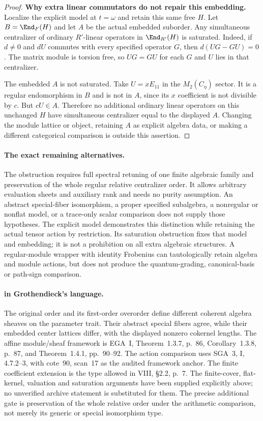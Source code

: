 \begin{proof}
\par\smallskip\noindent\textbf{Why extra linear commutators do not repair this embedding.}\quad
Localize the explicit model at $t=\omega$ and retain
this same free $H$. Let $B=\End_F(H)$ and let $A$
be the actual embedded suborder.
Any simultaneous centralizer of ordinary $R'$-linear
operators in $\End_{R'}(H)$ is saturated.
Indeed, if $d\ne0$ and $dU$ commutes with every
specified operator $G$, then
$d(UG-GU)=0$.
The matrix module is torsion free, so $UG=GU$ for
each $G$ and $U$ lies in that centralizer.

The embedded $A$ is not saturated.
Take $U=xE_{11}$ in the $M_2(C_\eta)$ sector.
It is a regular endomorphism in $B$ and is not in
$A$, since its $x$ coefficient is not divisible
by $c$. But $cU\in A$.
Therefore no additional ordinary linear operators
on this unchanged $H$ have simultaneous centralizer
equal to the displayed $A$.
Changing the module lattice or object, retaining
$A$ as explicit algebra data, or making a different
categorical comparison is outside this assertion.
\end{proof}

\paragraph{The exact remaining alternatives.}
The obstruction requires full spectral retuning of
one finite algebraic family and preservation of the
whole regular relative centralizer order.
It allows arbitrary evaluation sheets and auxiliary
rank and needs no purity assumption.
An abstract special-fiber isomorphism, a proper
specified subalgebra, a nonregular or nonflat model,
or a trace-only scalar comparison does not supply
those hypotheses.
The explicit model demonstrates this distinction
while retaining the actual tensor action by restriction.
Its saturation obstruction fixes that model and
embedding; it is not a prohibition on all extra
algebraic structures.
A regular-module wrapper with identity Frobenius
can tautologically retain algebra and module actions,
but does not produce the quantum-grading, canonical-basis
or path-sign comparison.

\paragraph{ in Grothendieck's language.}
The original order and its first-order overorder
define different coherent algebra sheaves on the
parameter trait. Their abstract special fibers agree,
while their embedded center lattices differ, with
the displayed nonzero cokernel lengths.
The affine module/sheaf framework is EGA~I,
Theorem~1.3.7, p.~86, Corollary~1.3.8, p.~87,
and Theorem~1.4.1, pp.~90--92.
The action comparison uses SGA~3, I, 4.7.2--3,
with cote~90, scan~17 as the audited framework anchor.
The finite coefficient extension is the type
allowed in VIII, \S2.2, p.~7.
The finite-cover, flat-kernel, valuation and
saturation arguments have been supplied explicitly
above; no unverified archive statement is substituted
for them.
The precise additional gate is preservation of the
whole relative order under the arithmetic comparison,
not merely its generic or special isomorphism type.

